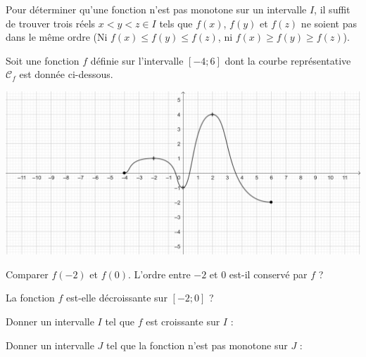 \documentclass{article}
\begin{document}
\begin{remark}
Pour déterminer qu'une fonction n'est pas monotone sur un intervalle $I$, il suffit de trouver trois réels $x < y < z \in I$ tels que $f(x)$, $f(y)$ et $f(z)$ ne soient pas dans le même ordre (Ni $f(x) \leq f(y) \leq f(z)$, ni $f(x) \geq f(y) \geq f(z)$). 
\end{remark}
\begin{example}
Soit une fonction $f$ définie sur l'intervalle $[-4;6]$ dont la courbe représentative $\mathcal{C}_f$ est donnée ci-dessous.
\begin{center}
\includegraphics[width=\textwidth]{Var_Fonctions.png}
\end{center}
\begin{enumquestions}
\item Comparer $f(-2)$ et $f(0)$. L'ordre entre $-2$ et $0$ est-il conservé par $f$ ? \answersline
\item La fonction $f$ est-elle décroissante sur $[-2;0]$ ? \answersline
\item Donner un intervalle $I$ tel que $f$ est croissante sur $I$ : \answersline
\item Donner un intervalle $J$ tel que la fonction n'est pas monotone sur $J$ : \answersline
\end{enumquestions}
\end{example}
\end{document}
